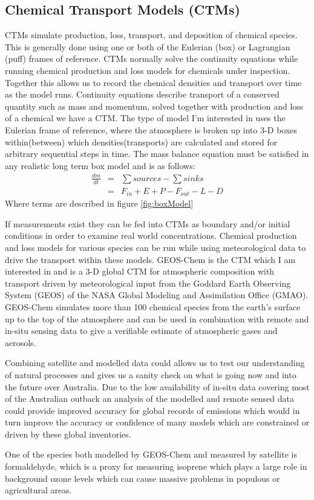 \subsection{Chemical Transport Models (CTMs)}
CTMs simulate production, loss, transport, and deposition of chemical species.
This is generally done using one or both of the Eulerian (box) or Lagrangian (puff) frames of reference.
CTMs normally solve the continuity equations while running chemical production and loss models for chemicals under inspection. Together this allows us to record the chemical densities and transport over time as the model runs.
Continuity equations describe transport of a conserved quantity such as mass and momentum, solved together with production and loss of a chemical we have a CTM.
The type of model I'm interested in uses the Eulerian frame of reference, where the atmosphere is broken up into 3-D boxes within(between) which densities(transports) are calculated and stored for arbitrary sequential steps in time.
The mass balance equation must be satisfied in any realistic long term box model and is as follows: 
\begin{eqnarray*}
\frac{dm}{dt} &=& \sum{sources}-\sum{sinks} \\
    &=& F_{in} + E + P - F_{out} - L - D \end{eqnarray*}
Where terms are described in figure \ref{fig:boxModel}

If measurements exist they can be fed into CTMs as boundary and/or initial conditions in order to examine real world concentrations.
Chemical production and loss models for various species can be run while using meteorological data to drive the transport within these models.
GEOS-Chem is the CTM which I am interested in and is a 3-D global CTM for atmospheric composition with transport driven by meteorological input from the Goddard Earth Observing System (GEOS) of the NASA Global Modeling and Assimilation Office (GMAO).
GEOS-Chem simulates more than 100 chemical species from the earth's surface up to the top of the atmosphere and can be used in combination with remote and in-situ sensing data to give a verifiable estimate of atmospheric gases and aerosols.

Combining satellite and modelled data could allows us to test our understanding of natural processes and gives us a sanity check on what is going now and into the future over Australia.
Due to the low availability of in-situ data covering most of the Australian outback an analysis of the modelled and remote sensed data could provide improved accuracy for global records of emissions which would in turn improve the accuracy or confidence of many models which are constrained or driven by these global inventories.

One of the species both modelled by GEOS-Chem and measured by satellite is formaldehyde, which is a proxy for measuring isoprene which plays a large role in background ozone levels which can cause massive problems in populous or agricultural areas.